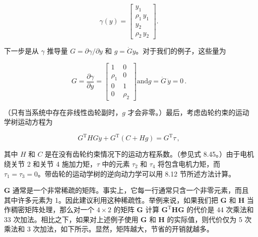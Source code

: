 \documentclass[10pt,a4paper]{book}
\theoremstyle{thmstyle} %
\theoremstyle{defstyle} %
\theoremstyle{prostyle} %
\begin{document}
$$
\gamma ( y ) = \left[ \begin{array}{l} { y _ { 1 } } \\{ \rho _ { 1 } \, y _ { 1 } } \\{ y _ { 2 } } \\{ \rho _ { 2 } \, y _ { 2 } } \end{array} \right] .
$$



下一步是从 $\gamma$ 推导量 $G=\partial\gamma/\partial y$ 和 $g=\dot{G}y$。对于我们的例子，这些量为



$$
G = \frac { \partial \gamma } { \partial y } = \left[ \begin{array}{ll} { 1 } & { 0 } \\{ \rho _ { 1 } } & { 0 } \\{ 0 } & { 1 } \\{ 0 } & { \rho _ { 2 } } \end{array} \right]  \mathrm { a n d }  g = \dot { G } \, \dot { y } = 0 \, .
$$



（只有当系统中存在非线性齿轮副时，$g$ 才会非零。）最后，考虑齿轮约束的运动学树运动方程为



$$
G ^{\mathrm { T} } H G \ddot { y } + G ^{\mathrm { T} } ( C + H g ) = G ^{\mathrm { T} } \tau \, ,
$$



其中 $H$ 和 $C$ 是在没有齿轮约束情况下的运动方程系数。（参见式 8.45。）由于电机绕关节 2 和关节 4 施加力矩，$\tau$ 中的元素 $\tau_{2}$ 和 $\tau_{4}$ 将包含电机力矩，而 $\tau_{1}=\tau_{3}=0$。带齿轮的运动学树的逆向动力学可以用 8.12 节所述方法计算。



$\boldsymbol{G}$ 通常是一个非常稀疏的矩阵。事实上，它每一行通常只含一个非零元素，而且其中许多元素为 1。因此建议利用这种稀疏性。举例来说，如果我们把 $\boldsymbol{G}$ 和 $\boldsymbol{H}$ 当作稠密矩阵处理，那么对一个 $4 \times 2$ 的矩阵 $\boldsymbol{G}$ 计算 $\boldsymbol{G}^{\mathrm{T}} \boldsymbol{H} \boldsymbol{G}$ 的代价是 44 次乘法和 33 次加法。相比之下，如果对上述例子使用 $\boldsymbol{G}$ 和 $\boldsymbol{H}$ 的实际值，则代价仅为 5 次乘法和 3 次加法，如下所示。显然，矩阵越大，节省的开销就越多。
\end{document}
